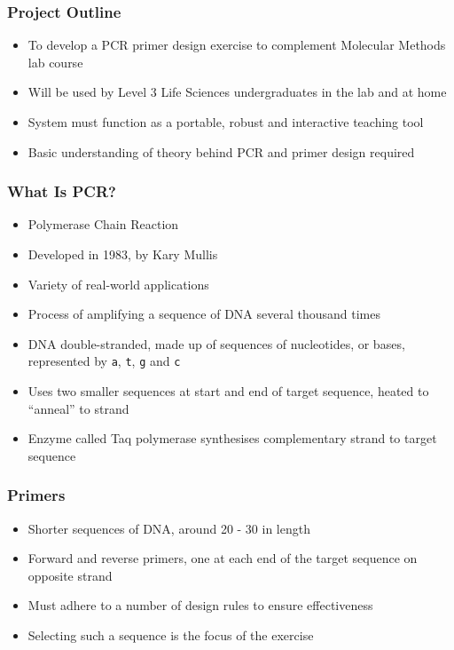 \frame{\titlepage}
\begin{frame}
	\frametitle{Project Outline}
	\begin{itemize}
		\item To develop a PCR primer design exercise to complement Molecular Methods lab course
		\item Will be used by Level 3 Life Sciences undergraduates in the lab and at home
		\item System must function as a portable, robust and interactive teaching tool
		\item Basic understanding of theory behind PCR and primer design required
	\end{itemize} 
\end{frame}    

\begin{frame}[fragile]
	\frametitle{What Is PCR?}
	\begin{itemize}
		\item Polymerase Chain Reaction
		\item Developed in 1983, by Kary Mullis
		\item Variety of real-world applications
		\item Process of amplifying a sequence of DNA several thousand times
		\item DNA double-stranded, made up of sequences of nucleotides, or bases, represented by \verb£a£, \verb£t£, \verb£g£ and \verb£c£
		\item Uses two smaller sequences at start and end of target sequence, heated to ``anneal'' to strand
		\item Enzyme called Taq polymerase synthesises complementary strand to target sequence
	\end{itemize}  
\end{frame}

\begin{frame}
	\frametitle{Primers}
	\begin{itemize}
		\item Shorter sequences of DNA, around 20 - 30 in length
		\item Forward and reverse primers, one at each end of the target sequence on opposite strand
		\item Must adhere to a number of design rules to ensure effectiveness
		\item Selecting such a sequence is the focus of the exercise
	\end{itemize}
\end{frame}

